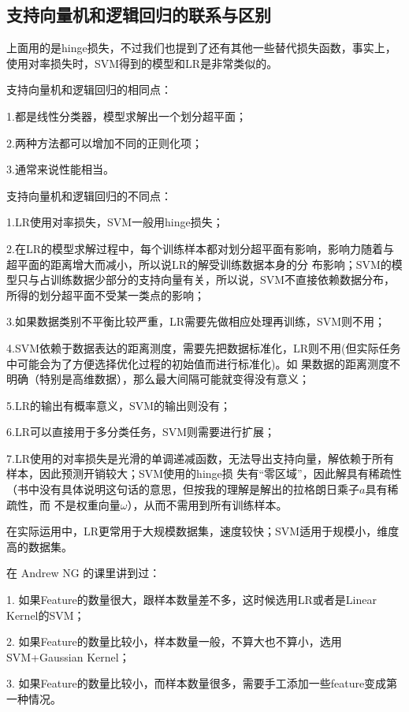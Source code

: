 \documentclass[UTF8]{ctexart}
\begin{document}
{\subsection{支持向量机和逻辑回归的联系与区别}
上面用的是hinge损失，不过我们也提到了还有其他一些替代损失函数，事实上，使用对率损失时，SVM得到的模型和LR是非常类似的。\par
支持向量机和逻辑回归的相同点：\par
1.都是线性分类器，模型求解出一个划分超平面；\par
2.两种方法都可以增加不同的正则化项；\par
3.通常来说性能相当。\par
支持向量机和逻辑回归的不同点：\par
1.LR使用对率损失，SVM一般用hinge损失；\par
2.在LR的模型求解过程中，每个训练样本都对划分超平面有影响，影响力随着与超平面的距离增大而减小，所以说LR的解受训练数据本身的分
布影响；SVM的模型只与占训练数据少部分的支持向量有关，所以说，SVM不直接依赖数据分布，所得的划分超平面不受某一类点的影响；\par
3.如果数据类别不平衡比较严重，LR需要先做相应处理再训练，SVM则不用；\par
4.SVM依赖于数据表达的距离测度，需要先把数据标准化，LR则不用(但实际任务中可能会为了方便选择优化过程的初始值而进行标准化)。如
果数据的距离测度不明确（特别是高维数据），那么最大间隔可能就变得没有意义；\par
5.LR的输出有概率意义，SVM的输出则没有；\par
6.LR可以直接用于多分类任务，SVM则需要进行扩展；\par
7.LR使用的对率损失是光滑的单调递减函数，无法导出支持向量，解依赖于所有样本，因此预测开销较大；SVM使用的hinge损
失有“零区域”，因此解具有稀疏性（书中没有具体说明这句话的意思，但按我的理解是解出的拉格朗日乘子$a$具有稀疏性，而
不是权重向量$\omega$），从而不需用到所有训练样本。\par
在实际运用中，LR更常用于大规模数据集，速度较快；SVM适用于规模小，维度高的数据集。\par
在 Andrew NG 的课里讲到过：\par
1. 如果Feature的数量很大，跟样本数量差不多，这时候选用LR或者是Linear Kernel的SVM；\par
2. 如果Feature的数量比较小，样本数量一般，不算大也不算小，选用SVM+Gaussian Kernel；\par
3. 如果Feature的数量比较小，而样本数量很多，需要手工添加一些feature变成第一种情况。\par
}
\end{document}
